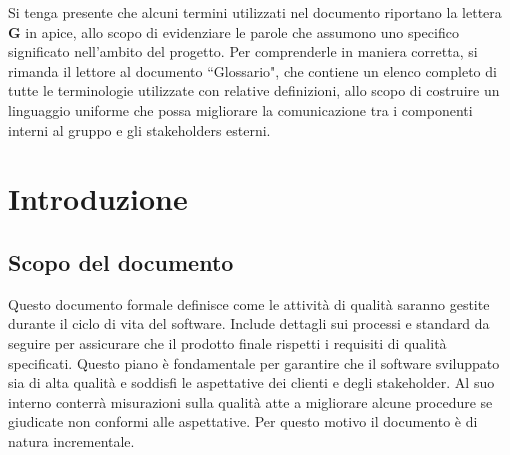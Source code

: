 \begin{beginningnote}
    Si tenga presente che alcuni termini utilizzati nel documento riportano la lettera \textbf{G} in apice, allo scopo di evidenziare le parole che assumono uno specifico significato nell'ambito del progetto. Per comprenderle in maniera corretta, si rimanda il lettore al documento ``Glossario", che contiene un elenco completo di tutte le terminologie utilizzate con relative definizioni, allo scopo di costruire un linguaggio uniforme che possa migliorare la comunicazione tra i componenti interni al gruppo e gli stakeholders esterni.   %
\end{beginningnote}


\section{Introduzione}

\subsection{Scopo del documento}\label{sec:scopo_del_documento}
\par Questo documento formale definisce come le attività di qualità saranno gestite durante il ciclo di vita del software. Include dettagli sui processi e standard da seguire per assicurare che il prodotto finale rispetti i requisiti di qualità specificati. Questo piano è fondamentale per garantire che il software sviluppato sia di alta qualità e soddisfi le aspettative dei clienti e degli stakeholder. Al suo interno conterrà misurazioni sulla qualità atte a migliorare alcune procedure se giudicate non conformi alle aspettative. Per questo motivo il documento è di natura incrementale.

